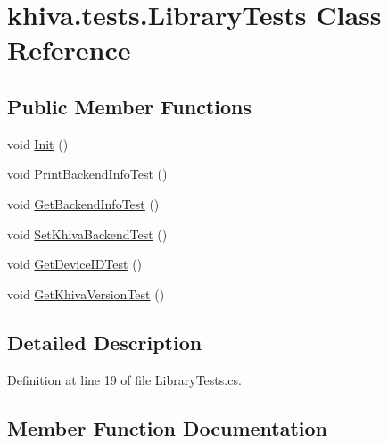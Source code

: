 \hypertarget{classkhiva_1_1tests_1_1_library_tests}{}\section{khiva.\+tests.\+Library\+Tests Class Reference}
\label{classkhiva_1_1tests_1_1_library_tests}
\subsection*{Public Member Functions}
\begin{DoxyCompactItemize}
\item 
void \mbox{\hyperlink{classkhiva_1_1tests_1_1_library_tests_ae624a8db90ded824948654d119a80908}{Init}} ()
\item 
void \mbox{\hyperlink{classkhiva_1_1tests_1_1_library_tests_a86e1ff816c1dcb200794bf7023318092}{Print\+Backend\+Info\+Test}} ()
\item 
void \mbox{\hyperlink{classkhiva_1_1tests_1_1_library_tests_a3b0583ea03e8a2f847a4b094b1d01690}{Get\+Backend\+Info\+Test}} ()
\item 
void \mbox{\hyperlink{classkhiva_1_1tests_1_1_library_tests_ad7aa97e9d85daf6ba8ce436384c81299}{Set\+Khiva\+Backend\+Test}} ()
\item 
void \mbox{\hyperlink{classkhiva_1_1tests_1_1_library_tests_ab964e30f331c2c3cc8ef3217efa374a4}{Get\+Device\+I\+D\+Test}} ()
\item 
void \mbox{\hyperlink{classkhiva_1_1tests_1_1_library_tests_aa48592f610a5a641727e300dd642b1df}{Get\+Khiva\+Version\+Test}} ()
\end{DoxyCompactItemize}


\subsection{Detailed Description}


Definition at line 19 of file Library\+Tests.\+cs.



\subsection{Member Function Documentation}
\mbox{\label{classkhiva_1_1tests_1_1_library_tests_a3b0583ea03e8a2f847a4b094b1d01690}} 
